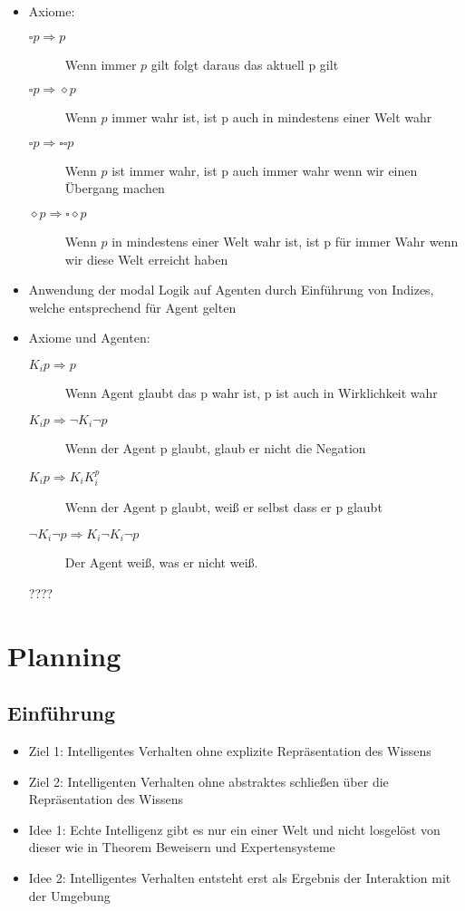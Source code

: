 \documentclass{article} %
\begin{document}
\begin{itemize}
\begin{itemize}
\begin{description}
			\end{description}
			\item Axiome:
			\begin{description}
				\item[$\square p \Rightarrow p$] Wenn immer $p$ gilt folgt daraus das aktuell p gilt
				\item[$\square p \Rightarrow \diamond p$] Wenn $p$ immer wahr ist, ist p auch in mindestens einer Welt wahr
				\item[$\square p \Rightarrow \square \square p$] Wenn $p$ ist immer wahr, ist p auch immer wahr wenn wir einen Übergang machen
				\item[$\diamond p \Rightarrow \square \diamond p$] Wenn $p$ in mindestens einer Welt wahr ist, ist p für immer Wahr wenn wir diese Welt erreicht haben
			\end{description}
			\item Anwendung der modal Logik auf Agenten durch Einführung von Indizes, welche entsprechend für Agent gelten
			\item Axiome und Agenten:
			\begin{description}
				\item[$K_{i}p \Rightarrow p$] Wenn Agent glaubt das p wahr ist, p ist auch in Wirklichkeit wahr
				\item[$K_{i}p \Rightarrow \neg K_{i}\neg p$] Wenn der Agent p glaubt, glaub er nicht die Negation
				\item[$K_{i}p \Rightarrow K_{i}K_{i}^p$] Wenn der Agent p glaubt, weiß er selbst dass er p glaubt
				\item[$\neg K_{i}\neg p \Rightarrow K_{i}\neg K_{i}\neg p$] Der Agent weiß, was er nicht weiß.
			\end{description}
		????
		\end{itemize}
	\end{itemize}
\section{Planning}
	\subsection{Einführung}
	\begin{itemize}
		\item Ziel 1: Intelligentes Verhalten ohne explizite Repräsentation des Wissens
		\item Ziel 2: Intelligenten Verhalten ohne abstraktes schließen über die Repräsentation des Wissens
		\item Idee 1: Echte Intelligenz gibt es nur ein einer Welt und nicht losgelöst von dieser wie in Theorem Beweisern und Expertensysteme
		\item Idee 2: Intelligentes Verhalten entsteht erst als Ergebnis der Interaktion mit der Umgebung
	\end{itemize}
\end{document}
